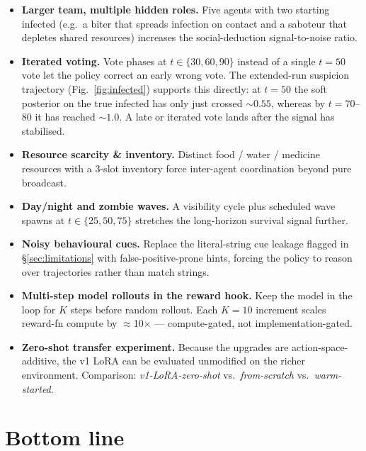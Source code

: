 \documentclass[11pt,a4paper]{article}
\begin{document}
\begin{itemize}[leftmargin=*,nosep]
  \item \textbf{Larger team, multiple hidden roles.} Five agents with two
        starting infected (e.g.\ a biter that spreads infection on contact
        and a saboteur that depletes shared resources) increases the
        social-deduction signal-to-noise ratio.
  \item \textbf{Iterated voting.} Vote phases at $t\in\{30,60,90\}$
        instead of a single $t{=}50$ vote let the policy correct an early
        wrong vote. The extended-run suspicion trajectory
        (Fig.~\ref{fig:infected}) supports this directly: at $t{=}50$
        the soft posterior on the true infected has only just crossed
        ${\sim}0.55$, whereas by $t{=}70$--$80$ it has reached ${\sim}1.0$.
        A late or iterated vote lands after the signal has stabilised.
  \item \textbf{Resource scarcity \& inventory.} Distinct food / water /
        medicine resources with a 3-slot inventory force inter-agent
        coordination beyond pure broadcast.
  \item \textbf{Day/night and zombie waves.} A visibility cycle plus
        scheduled wave spawns at $t\in\{25,50,75\}$ stretches the
        long-horizon survival signal further.
  \item \textbf{Noisy behavioural cues.} Replace the literal-string cue
        leakage flagged in §\ref{sec:limitations} with false-positive-prone
        hints, forcing the policy to reason over trajectories rather than
        match strings.
  \item \textbf{Multi-step model rollouts in the reward hook.} Keep the
        model in the loop for $K$ steps before random rollout. Each
        $K{=}10$ increment scales reward-fn compute by $\approx$10$\times$
        --- compute-gated, not implementation-gated.
  \item \textbf{Zero-shot transfer experiment.} Because the upgrades are
        action-space-additive, the v1 LoRA can be evaluated unmodified on
        the richer environment. Comparison: \emph{v1-LoRA-zero-shot} vs.\
        \emph{from-scratch} vs.\ \emph{warm-started}.
\end{itemize}

\section{Bottom line}
\end{document}
